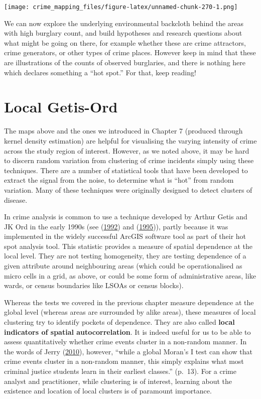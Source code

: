 \documentclass[
  krantz2]{krantz}
\begin{document}
\texttt{[image: crime\_mapping\_files/figure-latex/unnamed-chunk-270-1.png]}

We can now explore the underlying environmental backcloth behind the areas with high burglary count, and build hypotheses and research questions about what might be going on there, for example whether these are crime attractors, crime generators, or other types of crime places. However keep in mind that these are illustrations of the counts of observed burglaries, and there is nothing here which declares something a ``hot spot.'' For that, keep reading!

\hypertarget{local-getis-ord}{%
\section{Local Getis-Ord}\label{local-getis-ord}}

The maps above and the ones we introduced in Chapter 7 (produced through kernel density estimation) are helpful for visualising the varying intensity of crime across the study region of interest. However, as we noted above, it may be hard to discern random variation from clustering of crime incidents simply using these techniques. There are a number of statistical tools that have been developed to extract the signal from the noise, to determine what is ``hot'' from random variation. Many of these techniques were originally designed to detect clusters of disease.

In crime analysis is common to use a technique developed by Arthur Getis and JK Ord in the early 1990s (see (\protect\hyperlink{ref-Getis_1992}{1992}) and (\protect\hyperlink{ref-Ord_1995}{1995})), partly because it was implemented in the widely successful ArcGIS software tool as part of their hot spot analysis tool. This statistic provides a measure of spatial dependence at the local level. They are not testing homogeneity, they are testing dependence of a given attribute around neighbouring areas (which could be operationalised as micro cells in a grid, as above, or could be some form of administrative areas, like wards, or census boundaries like LSOAs or census blocks).

Whereas the tests we covered in the previous chapter measure dependence at the global level (whereas areas are surrounded by alike areas), these measures of local clustering try to identify pockets of dependence. They are also called \textbf{local indicators of spatial autocorrelation}. It is indeed useful for us to be able to assess quantitatively whether crime events cluster in a non-random manner. In the words of Jerry (\protect\hyperlink{ref-Ratcliffe_2010}{2010}), however, ``while a global Moran's I test can show that crime events cluster in a non-random manner, this simply explains what most criminal justice students learn in their earliest classes.'' (p.~13). For a crime analyst and practitioner, while clustering is of interest, learning about the existence and location of local clusters is of paramount importance.
\end{document}

